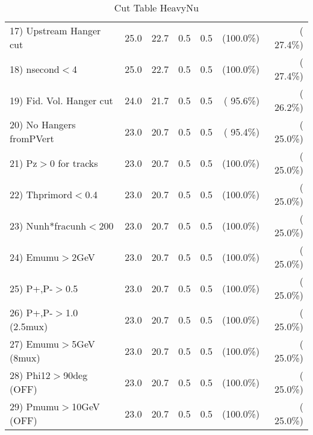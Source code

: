 \begin{table}[h!]
\begin{tabular}{||l||r|r|r|r|r|r||}
 17) Upstream Hanger cut  &         25.0 &         22.7 &          0.5 &          0.5 & (100.0\%) & ( 27.4\%) \\
 18) nsecond$<$4          &         25.0 &         22.7 &          0.5 &          0.5 & (100.0\%) & ( 27.4\%) \\
 19) Fid. Vol. Hanger cut &         24.0 &         21.7 &          0.5 &          0.5 & ( 95.6\%) & ( 26.2\%) \\
 20) No Hangers fromPVert &         23.0 &         20.7 &          0.5 &          0.5 & ( 95.4\%) & ( 25.0\%) \\
 21) Pz$>$0 for tracks    &         23.0 &         20.7 &          0.5 &          0.5 & (100.0\%) & ( 25.0\%) \\
 22) Thprimord$<$0.4      &         23.0 &         20.7 &          0.5 &          0.5 & (100.0\%) & ( 25.0\%) \\
 23) Nunh*fracunh$<$200   &         23.0 &         20.7 &          0.5 &          0.5 & (100.0\%) & ( 25.0\%) \\
 24) Emumu$>$2GeV         &         23.0 &         20.7 &          0.5 &          0.5 & (100.0\%) & ( 25.0\%) \\
 25) P+,P-$>$0.5          &         23.0 &         20.7 &          0.5 &          0.5 & (100.0\%) & ( 25.0\%) \\
 26) P+,P-$>$1.0 (2.5mux) &         23.0 &         20.7 &          0.5 &          0.5 & (100.0\%) & ( 25.0\%) \\
 27) Emumu$>$5GeV  (8mux) &         23.0 &         20.7 &          0.5 &          0.5 & (100.0\%) & ( 25.0\%) \\
 28) Phi12$>$90deg  (OFF) &         23.0 &         20.7 &          0.5 &          0.5 & (100.0\%) & ( 25.0\%) \\
 29) Pmumu$>$10GeV  (OFF) &         23.0 &         20.7 &          0.5 &          0.5 & (100.0\%) & ( 25.0\%) \\
 \hline
 \hline
 \end{tabular}
 \caption{Cut Table  HeavyNu  }
 \label{tab-cutheavy_neutrino}
 \end{table}
